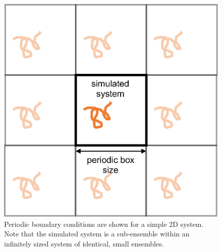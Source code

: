 \documentclass[9pt,bestpractices]{livecoms}
\begin{document}
\begin{figure}[h]
\centering
\includegraphics[width=\linewidth]{PBC_figure.pdf}
\caption{Periodic boundary conditions are shown for a simple 2D system. Note that the simulated system is a sub-ensemble within an infinitely sized system of identical, small ensembles.}
\label{pbcfig}
\end{figure}
\end{document}
